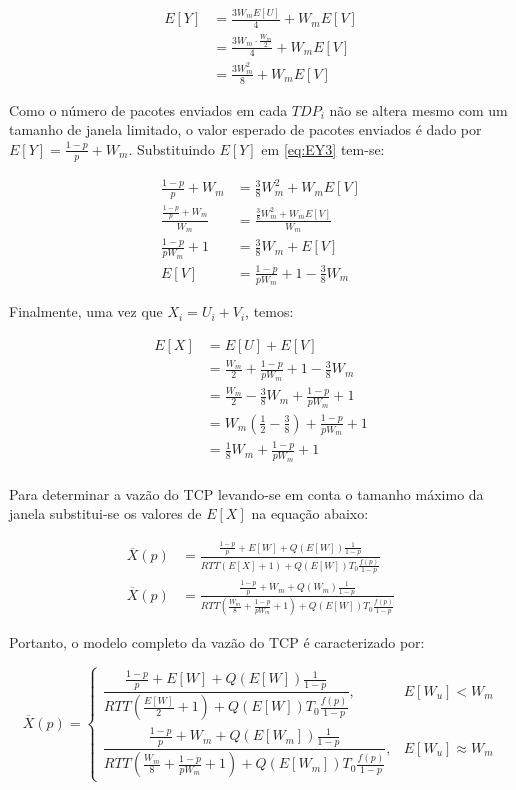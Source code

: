 \begin{align} \label{eq:EY3}
  \nonumber E[Y] &= \frac{3W_mE[U]}{4} + W_mE[V]\\
  \nonumber     &= \frac{3W_m\cdot \frac{W_m}{2}}{4} + W_mE[V]\\
      &= \frac{3W_m^2}{8} + W_mE[V]
\end{align}

Como o número de pacotes enviados em cada $TDP_i$ não se altera mesmo com um tamanho de janela limitado, o valor esperado de pacotes enviados é dado por $E[Y]=\frac{1-p}{p} + W_m$. Substituindo $E[Y]$ em \ref{eq:EY3} tem-se:

\begin{align} \label{eq:EY4}
  \nonumber \frac{1-p}{p} + W_m &= \frac{3}{8}W_m^2+W_mE[V]\\
  \nonumber \frac{ \frac{1-p}{p} + W_m }{W_m} &= \frac{ \frac{3}{8}W_m^2+W_mE[V] }{W_m}\\
  \nonumber \frac{1-p}{pW_m} + 1 &= \frac{3}{8}W_m+E[V]\\
  E[V] &= \frac{1-p}{pW_m} + 1 - \frac{3}{8}W_m
\end{align}

Finalmente, uma vez que $X_i=U_i+V_i$, temos:

\begin{align} \label{eq:EX}
  \nonumber E[X] &= E[U] + E[V]\\
  \nonumber &= \frac{W_m}{2} + \frac{1-p}{pW_m} + 1 - \frac{3}{8}W_m\\
  \nonumber &= \frac{W_m}{2} - \frac{3}{8}W_m + \frac{1-p}{pW_m} + 1\\
  \nonumber &= W_m(\frac{1}{2} - \frac{3}{8}) + \frac{1-p}{pW_m} + 1\\
  \nonumber &= \frac{1}{8}W_m + \frac{1-p}{pW_m} + 1\\
\end{align}

Para determinar a vazão do TCP levando-se em conta o tamanho máximo da janela substitui-se os valores de $E[X]$ na equação abaixo:

\begin{align} \label{eq:EX2}
  \nonumber  \overline{X}(p) &= \frac{\frac{1-p}{p}+E[W]+Q(E[W])\frac{1}{1-p}}{RTT(E[X]+1)+Q(E[W])T_0\frac{f(p)}{1-p}}\\
  \nonumber  \overline{X}(p) &= \frac{\frac{1-p}{p}+W_m+Q(W_m)\frac{1}{1-p}}{RTT(\frac{W_m}{8}+\frac{1-p}{pW_m}+1)+Q(E[W])T_0\frac{f(p)}{1-p}}
\end{align}

Portanto, o modelo completo da vazão do TCP é caracterizado por:

\begin{equation*}
\overline{X}(p)= 
\begin{cases} \dfrac{\frac{1-p}{p}+E[W]+Q(E[W])\frac{1}{1-p}}{RTT(\frac{E[W]}{2}+1)+Q(E[W])T_0\frac{f(p)}{1-p}}, & E[W_u]<W_m \\
\dfrac{\frac{1-p}{p}+W_m+Q(E[W_m])\frac{1}{1-p}}{RTT(\frac{W_m}{8}+\frac{1-p}{pW_m}+1)+Q(E[W_m])T_0\frac{f(p)}{1-p}}, & E[W_u]\approx W_m
\end{cases}
\label{eq:03}
\end{equation*}
